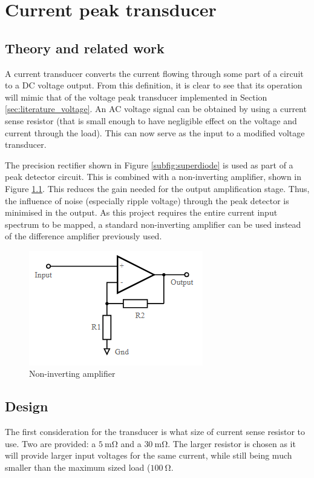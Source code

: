 \chapter{Current peak transducer}
\section{Theory and related work} \label{sec:literature_current}
A current transducer converts the current flowing through some part of a circuit to a DC voltage output. From this definition, it is clear to see that its operation will mimic that of the voltage peak transducer implemented in Section \ref{sec:literature_voltage}. An AC voltage signal can be obtained by using a current sense resistor (that is small enough to have negligible effect on the voltage and current through the load). This can now serve as the input to a modified voltage transducer.

The precision rectifier shown in Figure \ref{subfig:superdiode} is used as part of a peak detector circuit. This is combined with a non-inverting amplifier, shown in Figure \ref{fig:non_invert_amp}\cite{non_invert_amp}. This reduces the gain needed for the output amplification stage. Thus, the influence of noise (especially ripple voltage) through the peak detector is minimised in the output. As this project requires the entire current input spectrum to be mapped, a standard non-inverting amplifier can be used instead of the difference amplifier previously used.

\begin{figure}
        \centering
         \includegraphics[width=0.35\linewidth]{./Figures/non_invert_amplifier}
		    \caption{Non-inverting amplifier\cite{non_invert_amp}} \label{fig:non_invert_amp}
 \end{figure}
 
\section{Design} \label{sec:design_current}
The first consideration for the transducer is what size of current sense resistor to use. Two are provided: a $\SI{5}{\milli\ohm}$ and a $\SI{30}{\milli\ohm}$. The larger resistor is chosen as it will provide larger input voltages for the same current, while still being much smaller than the maximum sized load ($\SI{100}{\ohm}$.

